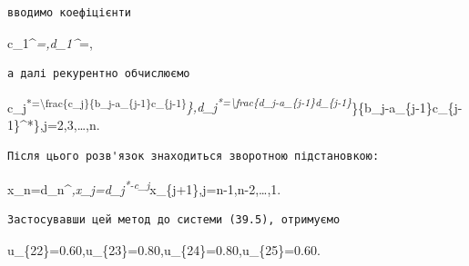 \documentclass[
  ukrainian,
]{article}
\begin{document}
\begin{verbatim}
вводимо коефіцієнти
\end{verbatim}

c\_1\^{}\emph{=,\qquad d\_1\^{}}=,

\begin{verbatim}
а далі рекурентно обчислюємо
\end{verbatim}

c\_j\textsuperscript{*=\textbackslash frac\{c\_j\}\{b\_j-a\_\{j-1\}c\_\{j-1\}}\emph{\},\qquad d\_j\textsuperscript{*=\textbackslash frac\{d\_j-a\_\{j-1\}d\_\{j-1\}}}\}\{b\_j-a\_\{j-1\}c\_\{j-1\}\^{}*\},\qquad j=2,3,\dots,n.

\begin{verbatim}
Після цього розв'язок знаходиться зворотною підстановкою:
\end{verbatim}

x\_n=d\_n\^{}\emph{,\qquad x\_j=d\_j\textsuperscript{*-c\_j}}x\_\{j+1\},\qquad j=n-1,n-2,\dots,1.

\begin{verbatim}
Застосувавши цей метод до системи (39.5), отримуємо
\end{verbatim}

u\_\{22\}=0.60,\qquad u\_\{23\}=0.80,\qquad u\_\{24\}=0.80,\qquad u\_\{25\}=0.60.
\end{document}
